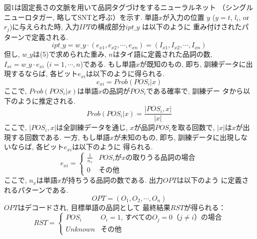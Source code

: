 図1は固定長さの文脈を用いて品詞タグづけをするニューラルネット
（シングルニューロタガー, 略してSNTと呼ぶ）を示す. 単語$x$が入力の位置
$y$ ($y=t$, $l_{i}$, or $r_{j}$)に与えられた時, 
入力$IPT$の構成部分$ipt\_y$ は以下のように
重み付けされたパターンで定義される.
\begin{equation}
ipt\_y=w\_y \cdot (e_{x1}, e_{x2}, \cdots, e_{xn})
=(I_{x1}, I_{x2}, \cdots, I_{xn})
\end{equation}
但し, $w\_y$は(5)で求められた重み, $n$はタイ語に定義された品詞の数, 
$I_{xi}=w\_y \cdot e_{xi}$ ($i=1,\cdots,n$)である. 
もし単語$x$が既知のもの, 即ち, 訓練データに出現するならば, 
各ビット$e_{xi}$は以下のように得られる.
\begin{equation}
e_{xi}=Prob(POS_{i}|x)
\end{equation}
ここで, $Prob(POS_{i}|x)$は単語$x$の品詞が$POS_{i}$である確率で, 訓練デー
タから以下のように推定される.
\begin{equation}
Prob(POS_{i}|x)=\frac{|POS_{i}, x|}{|x|}
\end{equation}
ここで, $|POS_{i}, x|$は全訓練データを通じ, $x$が品詞$POS_{i}$を取る回数で,
$|x|$は$x$が出現する回数である. 一方, もし単語$x$が未知のもの, 即ち, 
訓練データに出現しないならば, 各ビット$e_{xi}$は以下のように
得られる.
\begin{equation}
e_{xi}=\left\{ \begin{array}{ll}
    \frac{1}{n_{x}}  &  \mbox{$POS_{i}$が$x$の取りうる品詞の場合} \\
    0  &  \mbox{その他}
  \end{array}
\right.
\end{equation}
ここで, $n_{x}$は単語$x$が持ちうる品詞の数である. 出力$OPT$は以下のよう
に定義されるパターンである.
\begin{equation}
OPT=(O_{1}, O_{2}, \cdots, O_{n})
\end{equation}
$OPT$はデコードされ, 目標単語の品詞として
最終結果$RST$が得られる：
\begin{equation}
RST=\left\{ \begin{array}{ll}
    POS_{i}  &  \mbox{$O_{i}=1$, すべての$O_{j}=0$（$j \neq i$）の場合} \\
    Unknown  &  \mbox{その他}
  \end{array}
\right.
\end{equation}

